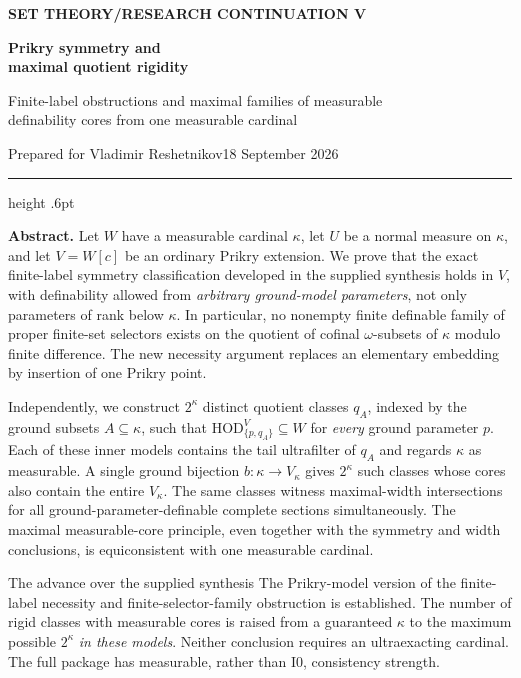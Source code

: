 \documentclass[11pt,letterpaper]{article}
\theoremstyle{definition}
\numberwithin{equation}{section}
\newcommand{\HOD}{\mathrm{HOD}}
\begin{document}
\thispagestyle{empty}
{\sffamily\bfseries\small\color{Olive}SET THEORY\quad /\quad RESEARCH CONTINUATION V}

\vspace{13pt}
{\fontsize{28}{31}\selectfont\bfseries\color{Forest}Prikry symmetry and\\ maximal quotient rigidity\par}
\vspace{10pt}
{\fontsize{14}{18}\selectfont Finite-label obstructions and maximal families of measurable\\ definability cores from one measurable cardinal\par}
\vspace{14pt}
{\color{Muted}Prepared for Vladimir Reshetnikov\hfill 18 September 2026\par}
\vspace{3pt}
{\color{Sage}\hrule height .6pt}
\vspace{12pt}

\textbf{Abstract.} Let $W$ have a measurable cardinal $\kappa$, let $U$ be a normal measure on $\kappa$, and let $V=W[c]$ be an ordinary Prikry extension. We prove that the exact finite-label symmetry classification developed in the supplied synthesis holds in $V$, with definability allowed from \emph{arbitrary ground-model parameters}, not only parameters of rank below $\kappa$. In particular, no nonempty finite definable family of proper finite-set selectors exists on the quotient of cofinal $\omega$-subsets of $\kappa$ modulo finite difference. The new necessity argument replaces an elementary embedding by insertion of one Prikry point.

Independently, we construct $2^\kappa$ distinct quotient classes $q_A$, indexed by the ground subsets $A\subseteq\kappa$, such that $\HOD_{\{p,q_A\}}^V\subseteq W$ for \emph{every} ground parameter $p$. Each of these inner models contains the tail ultrafilter of $q_A$ and regards $\kappa$ as measurable. A single ground bijection $b:\kappa\to V_\kappa$ gives $2^\kappa$ such classes whose cores also contain the entire $V_\kappa$. The same classes witness maximal-width intersections for all ground-parameter-definable complete sections simultaneously. The maximal measurable-core principle, even together with the symmetry and width conclusions, is equiconsistent with one measurable cardinal.

\begin{assessment}{The advance over the supplied synthesis}
The Prikry-model version of the finite-label necessity and finite-selector-family obstruction is established. The number of rigid classes with measurable cores is raised from a guaranteed $\kappa$ to the maximum possible $2^\kappa$ \emph{in these models}. Neither conclusion requires an ultraexacting cardinal. The full package has measurable, rather than $\mathrm{I0}$, consistency strength.
\end{assessment}
\end{document}
